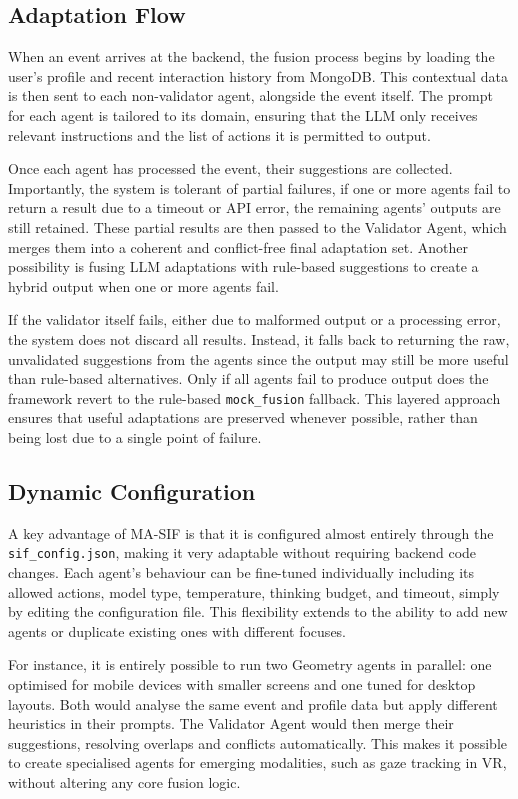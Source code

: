 \documentclass[openany]{book}
\begin{document}
\subsection{Adaptation Flow}
When an event arrives at the backend, the fusion process begins by loading the user’s profile and recent interaction history from MongoDB. This contextual data is then sent to each non-validator agent, alongside the event itself. The prompt for each agent is tailored to its domain, ensuring that the LLM only receives relevant instructions and the list of actions it is permitted to output.

Once each agent has processed the event, their suggestions are collected. Importantly, the system is tolerant of partial failures, if one or more agents fail to return a result due to a timeout or API error, the remaining agents’ outputs are still retained. These partial results are then passed to the Validator Agent, which merges them into a coherent and conflict-free final adaptation set. Another possibility is fusing LLM adaptations with rule-based suggestions to create a hybrid output when one or more agents fail.

If the validator itself fails, either due to malformed output or a processing error, the system does not discard all results. Instead, it falls back to returning the raw, unvalidated suggestions from the agents since the output may still be more useful than rule-based alternatives. Only if all agents fail to produce output does the framework revert to the rule-based \texttt{mock\_fusion} fallback. This layered approach ensures that useful adaptations are preserved whenever possible, rather than being lost due to a single point of failure.

\subsection{Dynamic Configuration}
A key advantage of MA-SIF is that it is configured almost entirely through the \texttt{sif\_config.json}, making it very adaptable without requiring backend code changes. Each agent’s behaviour can be fine-tuned individually including its allowed actions, model type, temperature, thinking budget, and timeout, simply by editing the configuration file. This flexibility extends to the ability to add new agents or duplicate existing ones with different focuses.

For instance, it is entirely possible to run two Geometry agents in parallel: one optimised for mobile devices with smaller screens and one tuned for desktop layouts. Both would analyse the same event and profile data but apply different heuristics in their prompts. The Validator Agent would then merge their suggestions, resolving overlaps and conflicts automatically. This makes it possible to create specialised agents for emerging modalities, such as gaze tracking in VR, without altering any core fusion logic.
\end{document}
